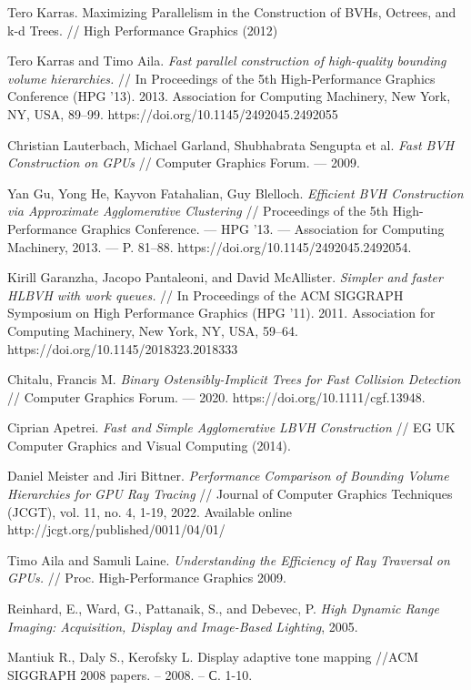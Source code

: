 \documentclass[11pt,fleqn,english,russian]{report} %
\begin{document}
\begin{thebibliography}{10}
	 Tero Karras. Maximizing Parallelism in the Construction of BVHs, Octrees, and k-d Trees. // High Performance Graphics (2012)
	
	 Tero Karras and Timo Aila. \textit{Fast parallel construction of high-quality bounding volume hierarchies.} // In Proceedings of the 5th High-Performance Graphics Conference (HPG '13). 2013. Association for Computing Machinery, New York, NY, USA, 89–99. https://doi.org/10.1145/2492045.2492055
	
	 Christian Lauterbach, Michael Garland, Shubhabrata Sengupta et al. \textit{Fast BVH Construction on GPUs} // Computer Graphics Forum. — 2009.
	
	 Yan Gu, Yong He, Kayvon Fatahalian, Guy Blelloch. \textit{Efficient BVH Construction via Approximate Agglomerative Clustering} // Proceedings of the 5th High-Performance Graphics Conference. — HPG ’13. — Association for Computing Machinery, 2013. — P. 81–88. https://doi.org/10.1145/2492045.2492054.
	
	 Kirill Garanzha, Jacopo Pantaleoni, and David McAllister. \textit{Simpler and faster HLBVH with work queues.} // In Proceedings of the ACM SIGGRAPH Symposium on High Performance Graphics (HPG '11). 2011. Association for Computing Machinery, New York, NY, USA, 59–64. https://doi.org/10.1145/2018323.2018333
	
	 Chitalu, Francis M. \textit{Binary Ostensibly-Implicit Trees for Fast Collision Detection} // Computer Graphics Forum. — 2020. https://doi.org/10.1111/cgf.13948.
	
	 Ciprian Apetrei. \textit{Fast and Simple Agglomerative LBVH Construction} // EG UK Computer Graphics and Visual Computing (2014).
	
	 Daniel Meister and Jiri Bittner. \textit{Performance Comparison of Bounding Volume Hierarchies for GPU Ray Tracing} // Journal of Computer Graphics Techniques (JCGT), vol. 11, no. 4, 1-19, 2022. Available online http://jcgt.org/published/0011/04/01/
	
	 Timo Aila and Samuli Laine. \textit{Understanding the Efficiency of Ray Traversal on GPUs.} // Proc. High-Performance Graphics 2009.
	
	 Reinhard, E., Ward, G., Pattanaik, S., and Debevec, P. \textit{High Dynamic Range Imaging: Acquisition, Display and Image-Based Lighting}, 2005.
	
	 Mantiuk R., Daly S., Kerofsky L. Display adaptive tone mapping //ACM SIGGRAPH 2008 papers. – 2008. – С. 1-10.
	
\end{thebibliography}
\end{document}
